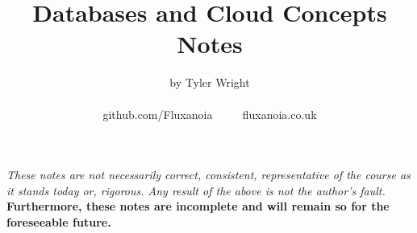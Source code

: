 \documentclass[a4paper, 12pt, twoside]{article}
\begin{document}
\title{Databases and Cloud Concepts Notes}
\date{}
\author{by Tyler Wright \\
  \\
  github.com/Fluxanoia $\qquad$ fluxanoia.co.uk
}
\maketitle

\vfill

\textit{These notes are not necessarily correct,
consistent, representative of the course as it stands today or, 
rigorous. Any result of the above is not the author's fault.}
\\[\baselineskip]
\textbf{Furthermore, these notes are incomplete and will remain so for the 
foreseeable future.}

% 

\newpage

\tableofcontents








\end{document}
